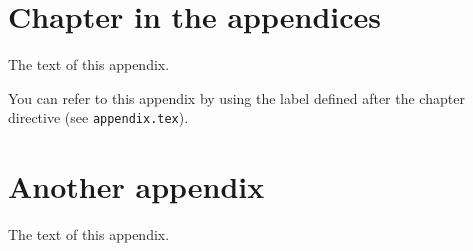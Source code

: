 \begin{appendices}

\chapter{Chapter in the appendices}
\label{apx:example}

The text of this appendix.





  







You can refer to this appendix by using the label defined after the chapter directive (see \texttt{appendix.tex}).

\restoregeometry
\newpage

\chapter{Another appendix}
The text of this appendix.
\end{appendices}
